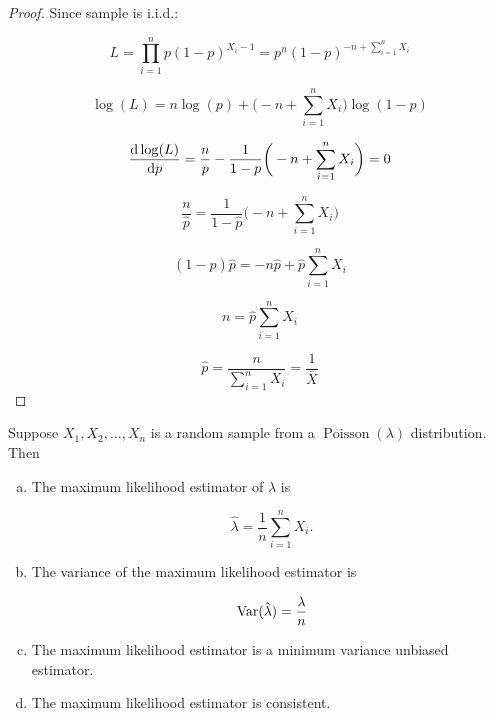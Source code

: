 \begin{proof}
Since sample is i.i.d.:

\[
L = \prod_{i=1}^n p(1-p)^{X_i-1} = p^n(1-p)^{-n + \sum_{i=1}^n X_i }
\]

\[
\log(L) = n \log(p) + \bigg( -n + \sum_{i=1}^n X_i \bigg) \log(1-p)
\]

\[
\deriv{\log(L)}{p} =  \frac{n}{p} - \frac{1}{1-p} \bigg( -n + \sum_{i=1}^n X_i \bigg) = 0 
\]

\[
\frac{n}{\hat{p}} = \frac{1}{1-\hat{p}} \bigg( -n + \sum_{i=1}^n X_i \bigg)
\]

\[
(1-\hat{p}) \hat{p} = -n \hat{p} + \hat{p} \sum_{i=1}^n X_i
\]

\[
n = \hat{p} \sum_{i=1}^n X_i
\]

\[
\hat{p} = \frac{n}{\sum_{i=1}^n X_i} = \frac{1}{\bar{X}}
\]

\end{proof}

\begin{proposition} Suppose \(X_1, X_2, \ldots, X_n\) is a random sample from a \(\operatorname{Poisson}(\lambda)\) distribution. Then 

\begin{enumerate}[(a)]

\item The maximum likelihood estimator of \(\lambda\) is 

\[
\hat{\lambda} = \frac{1}{n} \sum_{i=1}^n X_i .
\]

\item The variance of the maximum likelihood estimator is

\[
\Var(\hat{\lambda})  = \frac{\lambda}{n}
\]

\item The maximum likelihood estimator is a minimum variance unbiased estimator.

\item The maximum likelihood estimator is consistent.

\end{enumerate}

\end{proposition}

